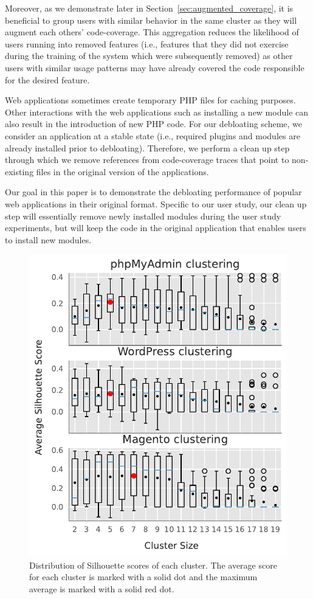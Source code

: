 Moreover, as we demonstrate later in Section~\ref{sec:augmented_coverage}, it is beneficial to group users with similar behavior in the same cluster as they will augment each others' code-coverage. 
This aggregation reduces the likelihood of users running into removed features (i.e., features that they did not exercise during the training of the system which were subsequently removed) as other users with similar usage patterns may have already covered the code responsible for the desired feature. 

Web applications sometimes create temporary PHP files for caching purposes. 
Other interactions with the web applications such as installing a new module can also result in the introduction of new PHP code. 
For our debloating scheme, we consider an application at a stable state (i.e., required plugins and modules are already installed prior to debloating). 
Therefore, we perform a clean up step through which we remove references from code-coverage traces that point to non-existing files in the original version of the applications. 

Our goal in this paper is to demonstrate the debloating performance of popular web applications in their original format. 
Specific to our user study, our clean up step will essentially remove newly installed modules during the user study experiments, but will keep the code in the original application that enables users to install new modules. 

\begin{figure}[]
    \centering
    \includegraphics[width=0.45
    \textwidth]{figures/dbltr/silhouette.pdf}
    \caption{Distribution of Silhouette scores of each cluster. The average score for each cluster is marked with a solid dot and the maximum average is marked with a solid red dot.}
    \label{fig:silhouette_scores}
\end{figure}


